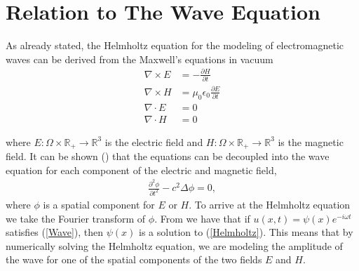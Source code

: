 \documentclass[10pt,a4paper]{article}
\begin{document}
\section*{Relation to The Wave Equation}
As already stated, the Helmholtz equation for the modeling of electromagnetic waves can be derived from the Maxwell's equations in vacuum
\begin{align*}
\nabla \times E &= - \frac{\partial H}{\partial t} \\
\nabla \times H &= \mu_0 \epsilon _0 \frac{\partial E}{\partial t} \\
\nabla \cdot E &= 0 \\
\nabla \cdot H &= 0
\end{align*}

where $E: \Omega \times \mathbb{R}_+ \rightarrow \mathbb{R}^3$ is the electric field and $H: \Omega \times \mathbb{R}_+ \rightarrow \mathbb{R}^3$ is the magnetic field. It can be shown (\cite{Project}) that the equations can be decoupled into the wave equation for each component of the electric and magnetic field,
\begin{equation}
\begin{aligned}
\label{Wave}
\frac{\partial^2 \phi}{\partial t^2} - c^2 \Delta \phi = 0, 
\end{aligned}
\end{equation}
where $\phi$ is a spatial component for $E$ or $H$. To arrive at the Helmholtz equation we take the Fourier transform of $\phi$. From \cite{Helmholtz-Wave} we have that if $u(x,t) = \psi (x)e^{-i \omega t}$ satisfies (\ref{Wave}), then $\psi (x)$ is a solution to (\ref{Helmholtz}). This means that by numerically solving the Helmholtz equation, we are modeling the amplitude of the wave for one of the spatial components of the two fields $E$ and $H$.
\end{document}
